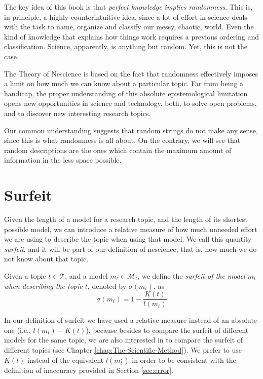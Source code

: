 {\color{red}
The key idea of this book is that \emph{perfect knowledge implies randomness}. This is, in principle, a highly counterintuitive idea, since a lot of effort in science deals with the task to name, organize and classify our messy, chaotic, world. Even the kind of knowledge that explains how things work requires a previous ordering and classification. Science, apparently, is anything but random. Yet, this is not the case.

The Theory of Nescience is based on the fact that randomness effectively imposes a limit on how much we can know about a particular topic. Far from being a handicap, the proper understanding of this absolute epistemological limitation opens new opportunities in science and technology, both, to solve open problems, and to discover new interesting research topics.

Our common understanding suggests that random strings do not make any sense, since this is what randomness is all about. On the contrary, we will see that random descriptions are the ones which contain the maximum amount of information in the less space possible.
}

%
%

\section{Surfeit}
\label{sec:Definition_redundancy}

Given the length of a model for a research topic, and the length of its shortest possible model, we can introduce a relative measure of how much unneeded effort we are using to describe the topic when using that model. We call this quantity \emph{surfeit}, and it will be part of our definition of nescience, that is, how much we do not know about that topic.

\begin{definition}[Surfeit]
Given a topic $t \in \mathcal{T}$, and a model $m_t \in \mathcal{M}_t$, we define the \emph{surfeit of the model $m_t$ when describing the topic $t$}, denoted by $\sigma(m_t)$, as
\[
\sigma (m_t) = 1 - \frac{K(t)}{l(m_t)}
\]
\end{definition}

In our definition of surfeit we have used a relative measure instead of an absolute one (i.e., $l\left(m_t\right) - K(t)$), because besides to compare the surfeit of different models for the same topic, we are also interested in to compare the surfeit of different topics (see Chapter \ref{chap:The-Scientific-Method}). We prefer to use $K(t)$ instead of the equivalent $l \left( m_t^\star \right)$ in order to be consistent with the definition of inaccuracy provided in Section \ref{sec:error}.

